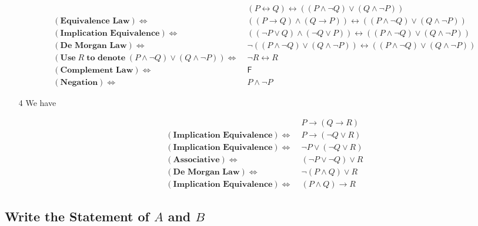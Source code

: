 \documentclass{article}
\begin{document}
\begin{itemize}
    $$
        \begin{aligned}
            &(P\leftrightarrow Q)\leftrightarrow((P\wedge\lnot Q)\vee (Q\wedge\lnot P))\\
            (\textbf{Equivalence Law}) \Leftrightarrow\;&((P\to Q)\wedge(Q\to P))\leftrightarrow ((P\wedge\lnot Q)\vee (Q\wedge\lnot P))\\
            (\textbf{Implication Equivalence}) \Leftrightarrow\;&((\lnot P\vee Q)\wedge(\lnot Q\vee P))\leftrightarrow((P\wedge\lnot Q)\vee (Q\wedge\lnot P))\\
            (\textbf{De Morgan Law}) \Leftrightarrow\;&\lnot((P\wedge\lnot Q)\vee (Q\wedge\lnot P))\leftrightarrow ((P\wedge\lnot Q)\vee (Q\wedge\lnot P))\\
            (\textbf{Use}\;R\;\textbf{to denote}\;(P\wedge\lnot Q)\vee (Q\wedge\lnot P)) \Leftrightarrow\;& \lnot R\leftrightarrow R\\
            (\textbf{Complement Law}) \Leftrightarrow\;&\mathsf{F}\\
            (\textbf{Negation}) \Leftrightarrow\;& P\wedge\lnot P
        \end{aligned}
    $$

    \item[4] We have

    $$
        \begin{aligned}
            & P\to(Q\to R)\\
            (\textbf{Implication Equivalence}) \Leftrightarrow\;&P\to (\lnot Q\vee R)\\
            (\textbf{Implication Equivalence}) \Leftrightarrow\;&\lnot P\vee(\lnot Q\vee R)\\
            (\textbf{Associative}) \Leftrightarrow\;&(\lnot P\vee\lnot Q)\vee R\\
            (\textbf{De Morgan Law}) \Leftrightarrow\;&\lnot(P\wedge Q)\vee R\\
            (\textbf{Implication Equivalence}) \Leftrightarrow\;&(P\wedge Q)\to R
        \end{aligned}
    $$

\end{itemize}

\subsection{Write the Statement of  $A$ and $B$}
\end{document}
